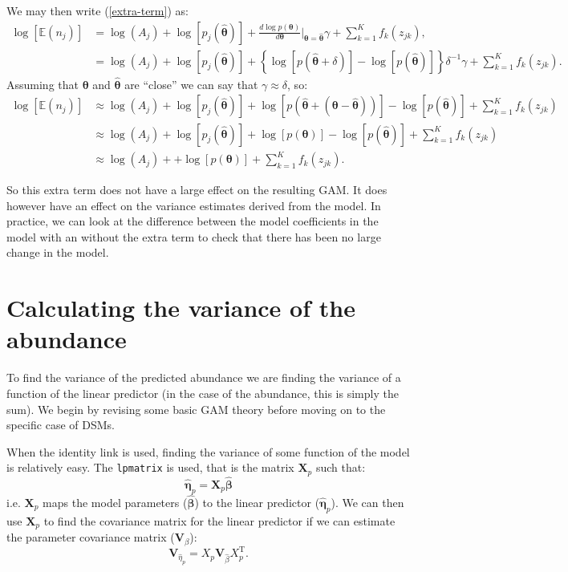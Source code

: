\documentclass[11pt]{amsart}
\begin{document}
We may then write (\ref{extra-term}) as:
\begin{align*}
\log\left[ \mathbb{E}(n_j) \right] &= \log\left(A_j\right) + \log\left[p_j(\bm{\hat{\theta}})\right] + \frac{ d \log p(\bm{\theta})}{d\bm{\theta}} \Big\vert_{\bm{\theta} = \hat{\bm{\theta}}} \gamma + \sum_{k=1}^K f_k(z_{jk}),\\
&= \log\left(A_j\right) + \log\left[p_j(\bm{\hat{\theta}})\right] + \left\{\log\left[p(\hat{\bm{\theta}} + \delta)\right] - \log\left[p(\hat{\bm{\theta}})\right]\right\}\delta^{-1} \gamma + \sum_{k=1}^K f_k(z_{jk}).
\end{align*}
Assuming that $\bm{\theta}$ and $\bm{\hat{\theta}}$ are ``close'' we can say that $\gamma \approx \delta$, so:
\begin{align*}
\log\left[ \mathbb{E}(n_j) \right] &\approx \log\left(A_j\right) + \log\left[p_j(\bm{\hat{\theta}})\right] + \log\left[p(\hat{\bm{\theta}} + (\bm{\theta} - \bm{\hat{\theta}}))\right] - \log\left[p(\hat{\bm{\theta}})\right] + \sum_{k=1}^K f_k(z_{jk})\\
&\approx \log\left(A_j\right) + \log\left[p_j(\bm{\hat{\theta}})\right] + \log\left[p(\bm{\theta})\right] - \log\left[p(\hat{\bm{\theta}})\right] + \sum_{k=1}^K f_k(z_{jk})\\
&\approx \log\left(A_j\right) + + \log\left[p(\bm{\theta})\right] + \sum_{k=1}^K f_k(z_{jk}).
\end{align*}

So this extra term does not have a large effect on the resulting GAM. It does however have an effect on the variance estimates derived from the model. In practice, we can look at the difference between the model coefficients in the model with an without the extra term to check that there has been no large change in the model.

\section{Calculating the variance of the abundance}

To find the variance of the predicted abundance we are finding the variance of a function of the linear predictor (in the case of the abundance, this is simply the sum). We begin by revising some basic GAM theory before moving on to the specific case of DSMs. 

When the identity link is used, finding the variance of some function of the model is relatively easy. The \texttt{lpmatrix} \citep[][page 245]{Wood:2006wz} is used, that is the matrix $\bm{X}_{p}$ such that:
$$
\hat{\bm{\eta}}_p = \bm{X}_{p} \hat{\bm{\beta}}
$$
i.e. $\bm{X}_{p}$ maps the model parameters ($\hat{\bm{\beta}}$) to the linear predictor ($\hat{\bm{\eta}}_p$). We can then use $\bm{X}_{p}$ to find the covariance matrix for the linear predictor if we can estimate the parameter covariance matrix ($\bm{V}_{\beta}$):
$$
\bm{V}_{\hat{\eta}_p} = X_p \bm{V}_{\hat{\beta}} X_p^\text{T}.
$$
\end{document}

